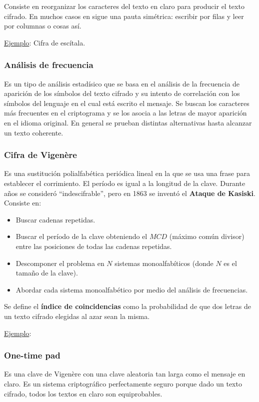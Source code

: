 Consiste en reorganizar los caracteres del texto en claro para producir el texto cifrado. En muchos casos en sigue una pauta simétrica: escribir por filas y leer por columnas o cosas así. 

\underline{Ejemplo}: Cifra de escítala.

\subsubsection{Análisis de frecuencia}
Es un tipo de análisis estadísico que se basa en el análisis de la frecuencia de aparición de los símbolos del texto cifrado y su intento de correlación con los símbolos del lenguaje en el cual está escrito el mensaje. Se buscan los caracteres más frecuentes en el criptograma y se los asocia a las letras de mayor aparición en el idioma original. En general se prueban distintas alternativas hasta alcanzar un texto coherente.

\subsubsection{Cifra de Vigenère}
Es una sustitución polialfabética periódica lineal en la que se usa una frase para establecer el corrimiento. El período es igual a la longitud de la clave. Durante años se consideró ``indescifrable'', pero en 1863 se inventó el \textbf{Ataque de Kasiski}. Consiste en:
\begin{itemize}
	\item Buscar cadenas repetidas.
	\item Buscar el período de la clave obteniendo el $MCD$ (máximo común divisor) entre las posiciones de todas las cadenas repetidas.
	\item Descomponer el problema en $N$ sistemas monoalfabíticos (donde $N$ es el tamaño de la clave).
	\item Abordar cada sistema monoalfabético por medio del análisis de frecuencias.
\end{itemize}

Se define el \textbf{índice de coincidencias} como la probabilidad de que dos letras de un texto cifrado elegidas al azar sean la misma.

\underline{Ejemplo}:

\subsubsection{One-time pad}
Es una clave de Vigenère con una clave aleatoria tan larga como el mensaje en claro. Es un sistema criptográfico perfectamente seguro porque dado un texto cifrado, todos los textos en claro son equiprobables. 


